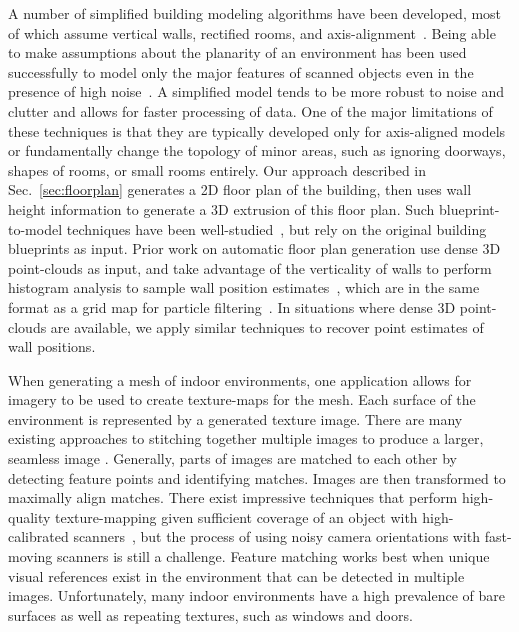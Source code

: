 \documentclass[10pt,twocolumn,twoside]{IEEEtran}
\begin{document}
A number of simplified building modeling algorithms have been developed, most of which assume vertical walls, rectified rooms, and axis-alignment~\cite{Museums,WallFinder}.  Being able to make assumptions about the planarity of an environment has been used successfully to model only the major features of scanned objects even in the presence of high noise~\cite{Lafarge13}.  A simplified model tends to be more robust to noise and clutter and allows for faster processing of data.  One of the major limitations of these techniques is that they are typically developed only for axis-aligned models or fundamentally change the topology of minor areas, such as ignoring doorways, shapes of rooms, or small rooms entirely.  Our approach described in Sec.~\ref{sec:floorplan} generates a 2D floor plan of the building, then uses wall height information to generate a 3D extrusion of this floor plan.  Such blueprint-to-model techniques have been well-studied~\cite{Or05,Lewis98}, but rely on the original building blueprints as input.  Prior work on automatic floor plan generation use dense 3D point-clouds as input, and take advantage of the verticality of walls to perform histogram analysis to sample wall position estimates~\cite{Okorn09,Eigencrust}, which are in the same format as a grid map for particle filtering~\cite{toro05}.  In situations where dense 3D point-clouds are available, we apply similar techniques to recover point estimates of wall positions.

When generating a mesh of indoor environments, one application allows for imagery to be used to create texture-maps for the mesh.  Each surface of the environment is represented by a generated texture image.  There are many existing approaches to stitching together multiple images to produce a larger, seamless image \cite{szeliski2006image,agarwalapanoramas,wangmultipleviews,coorg1997matching,debevechybrid,bernardinimultiplescans}.  Generally, parts of images are matched to each other by detecting feature points and identifying matches. Images are then transformed to maximally align matches.  There exist impressive techniques that perform high-quality texture-mapping given sufficient coverage of an object with high-calibrated scanners~\cite{Zhou14}, but the process of using noisy camera orientations with fast-moving scanners is still a challenge.  Feature matching works best when unique visual references exist in the environment that can be detected in multiple images.  Unfortunately, many indoor environments have a high prevalence of bare surfaces as well as repeating textures, such as windows and doors.
\end{document}
